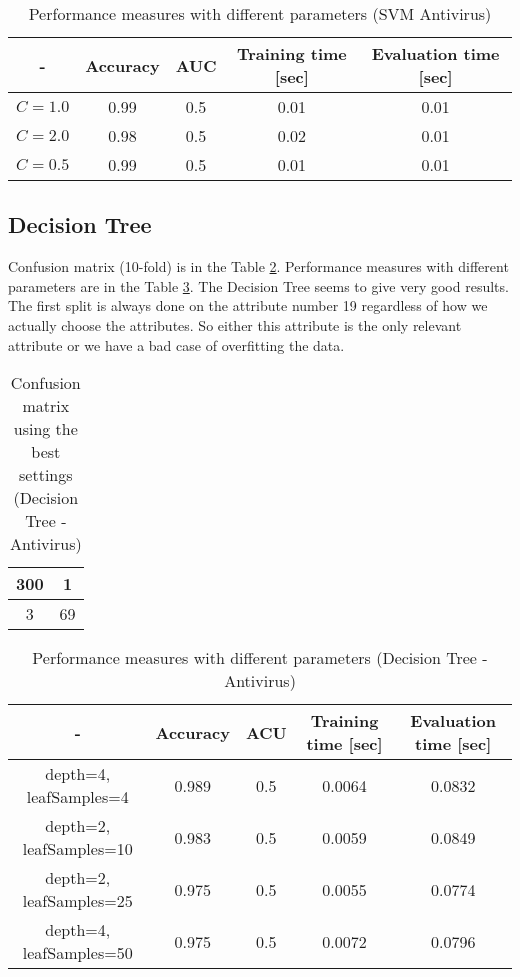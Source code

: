 \documentclass[11pt,a4paper,titlepage]{article}
\begin{document}
  \begin{table}
  \centering
  \begin{tabular}{| c | c | c | c | c |}
    \hline
     		-	   & Accuracy & 	AUC 	& Training time [sec] & Evaluation time [sec] \\ \hline
    $C = 1.0$ &  0.99	  	&     0.5		& 	0.01		  & 		0.01 		\\ \hline
    $C = 2.0$ & 	0.98	  & 	0.5 		& 		0.02			  &			0.01 		\\ \hline
    $C = 0.5$ & 		  0.99		& 		0.5			  &			0.01 & 0.01		\\ 
    \hline
  \end{tabular}
  \caption{Performance measures with different parameters (SVM Antivirus)}
  \label{table:SVMAntiVirus}
  \end{table}
  
\subsection{Decision Tree}
Confusion matrix (10-fold) is in the Table \ref{table:confusionMatrixDecisionTreeAntivirus}. Performance measures with different parameters are in the Table \ref{table:DecisionTreeAntiVirus}.
The Decision Tree seems to give very good results. The first split is always done on the attribute number 19 regardless of how we actually choose the attributes. So either this attribute is the only relevant attribute or we have a bad case of overfitting the data.
\begin{table}
  \centering
  \begin{tabular}{| c | c |}
    \hline
     \hline
    300 & 1  \\ \hline
    3 & 69 \\
    \hline
  \end{tabular}
  \caption{Confusion matrix using the best settings (Decision Tree - Antivirus)}
  \label{table:confusionMatrixDecisionTreeAntivirus}
  \end{table}
  
  \begin{table}
  \centering
  \begin{tabular}{| c | c | c | c | c |}
    \hline
     		-	   & Accuracy & 	ACU 	& Training time [sec] & Evaluation time [sec] \\ \hline
    depth=4, leafSamples=4 &  0.989 	  &     0.5		& 		0.0064			  & 		 0.0832 		\\ \hline
    depth=2, leafSamples=10 & 	0.983	  & 	0.5 		& 		0.0059			  &			 0.0849 		\\ \hline
    depth=2, leafSamples=25 & 	 0.975	  & 	0.5		& 		0.0055			  &			0.0774		\\ \hline
    depth=4, leafSamples=50 &  0.975       & 	0.5		& 		0.0072			  &			0.0796			\\
    \hline
  \end{tabular}
  \caption{Performance measures with different parameters (Decision Tree - Antivirus)}
  \label{table:DecisionTreeAntiVirus}
  \end{table}
  
\end{document}
